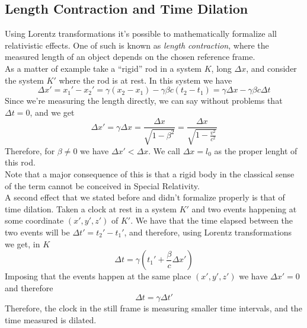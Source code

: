 \documentclass[../electromagnetism.tex]{subfiles}
\begin{document}
\subsection{Length Contraction and Time Dilation}
Using Lorentz transformations it's possible to mathematically formalize all relativistic effects. One of such is known as \emph{length contraction}, where the measured length of an object depends on the chosen reference frame.\\
As a matter of example take a ``rigid'' rod in a system $K$, long $\Delta x$, and consider the system $K'$ where the rod is at rest. In this system we have
\begin{equation}
	\Delta x'=x_1'-x_2'=\gamma(x_2-x_1)-\gamma\beta c(t_2-t_1)=\gamma\Delta x-\gamma\beta c\Delta t
	\label{eq:lengcontr}
\end{equation}
Since we're measuring the length directly, we can say without problems that $\Delta t=0$, and we get
\begin{equation}
	\Delta x'=\gamma\Delta x=\frac{\Delta x}{\sqrt{1-\beta^2}}=\frac{\Delta x}{\sqrt{1-\frac{v^2}{c^2}}}
	\label{eq:lengthcontr}
\end{equation}
Therefore, for $\beta\ne0$ we have $\Delta x'<\Delta x$. We call $\Delta x=l_0$ as the proper lenght of this rod.\\
Note that a major consequence of this is that a rigid body in the classical sense of the term cannot be conceived in Special Relativity.\\
A second effect that we stated before and didn't formalize properly is that of time dilation. Taken a clock at rest in a system $K'$ and two events happening at some coordinate $(x',y',z')$ of $K'$. We have that the time elapsed between the two events will be $\Delta t'=t_2'-t_1'$, and therefore, using Lorentz transformations we get, in $K$
\begin{equation}
	\Delta t=\gamma\left( t_1'+\frac{\beta}{c}\Delta x' \right)
	\label{eq:deltatK}
\end{equation}
Imposing that the events happen at the same place $(x',y',z')$ we have $\Delta x'=0$ and therefore
\begin{equation}
	\Delta t=\gamma\Delta t'
	\label{eq:timedil}
\end{equation}
Therefore, the clock in the still frame is measuring smaller time intervals, and the time measured is dilated.\\
\end{document}
